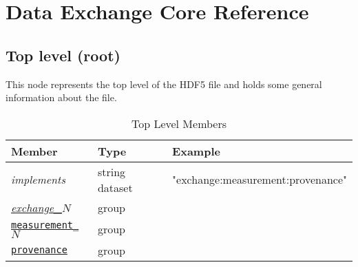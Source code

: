 
\section{Data Exchange Core Reference}
\label{sec:corereference}

\subsection{Top level (root)}
\label{table:top}

This node represents the top level of the HDF5 file and holds some general 
information about the file.

\begin{table}[h!]\sffamily
\centering
\footnotesize
\caption{Top Level Members}
\begin{tabular}{l l l}
\toprule
\bfseries Member & \bfseries Type & \bfseries Example \\
\midrule

\emph{implements} & string dataset & "exchange:measurement:provenance" \\
\hyperref[exchange:tomography]{\emph{exchange\_$N$}} & group & \\
\hyperref[table:measurement]{\tt{measurement\_$N$}} & group & \\
\hyperref[table:provenance]{\tt{provenance}} & group & \\

\bottomrule
\end{tabular}
\end{table}

